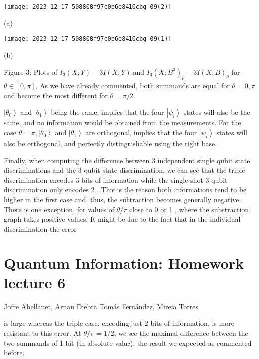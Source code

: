 \documentclass[10]{article}
\begin{document}
\begin{center}
\texttt{[image: 2023\_12\_17\_508808f97c0b6e8410cbg-09(2)]}
\end{center}

(a)

\begin{center}
\texttt{[image: 2023\_12\_17\_508808f97c0b6e8410cbg-09(1)]}
\end{center}

(b)

Figure 3: Plots of $I_{3}(X ; Y)-3 I(X ; Y)$ and $I_{3}\left(X ; B^{3}\right)_{\rho}-3 I(X ; B)_{\rho}$ for $\theta \in[0, \pi]$. As we have already commented, both summands are equal for $\theta=0, \pi$ and become the most different for $\theta=\pi / 2$.

$\left|\theta_{0}\right\rangle$ and $\left|\theta_{1}\right\rangle$ being the same, implies that the four $\left|\psi_{i}\right\rangle$ states will also be the same, and no information would be obtained from the measurements. For the case $\theta=\pi,\left|\theta_{0}\right\rangle$ and $\left|\theta_{1}\right\rangle$ are orthogonal, implies that the four $\left|\psi_{i}\right\rangle$ states will also be orthogonal, and perfectly distinguishable using the right base.

Finally, when computing the difference between 3 independent single qubit state discriminations and the 3 qubit state discrimination, we can see that the triple discrimination encodes 3 bits of information while the single-shot 3 qubit discrimination only encodes 2 . This is the reason both informations tend to be higher in the first case and, thus, the subtraction becomes generally negative. There is one exception, for values of $\theta / \pi$ close to 0 or 1 , where the substraction graph takes positive values. It might be due to the fact that in the individual discrimination the error

\section*{Quantum Information: Homework lecture 6}
Jofre Abellanet, Arnau Diebra Tomás Fernández, Mireia Torres

is large whereas the triple case, encoding just 2 bits of information, is more resistant to this error. At $\theta / \pi=1 / 2$, we see the maximal difference between the two summands of 1 bit (in absolute value), the result we expected as commented before.
\end{document}
